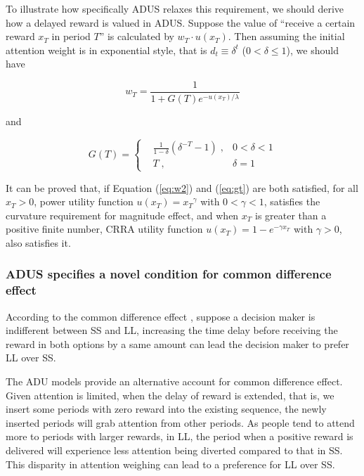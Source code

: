 \documentclass[
  12pt,
]{article}
\begin{document}
To illustrate how specifically ADUS relaxes this requirement, we should
derive how a delayed reward is valued in ADUS. Suppose the value of
``receive a certain reward \(x_T\) in period \(T\)'' is calculated by
\(w_T \cdot u(x_T)\). Then assuming the initial attention weight is in
exponential style, that is \(d_t\equiv\delta^t\) (\(0<\delta\leq1\)), we
should have

\begin{equation}\tag{2}\label{eq:w2}  
w_T = \frac{1}{1+G(T)e^{-u(x_T)/\lambda}}  
\end{equation}

and

\begin{equation}\tag{3}\label{eq:gt} 
G(T) = \left\{ 
\begin{aligned} 
& \frac{1}{1-\delta}(\delta^{-T}-1) \; ,& 0<\delta<1\\ 
& T\; ,& \delta=1
\end{aligned} \right. 
\end{equation}

It can be proved that, if Equation (\ref{eq:w2}) and (\ref{eq:gt}) are
both satisfied, for all \(x_T>0\), power utility function
\(u(x_T)={x_T}^\gamma\) with \(0<\gamma<1\), satisfies the curvature
requirement for magnitude effect, and when \(x_T\) is greater than a
positive finite number, CRRA utility function
\(u(x_T)=1-e^{-\gamma x_T}\) with \(\gamma>0\), also satisfies it.

\hypertarget{adus-specifies-a-novel-condition-for-common-difference-effect}{%
\subsubsection{ADUS specifies a novel condition for common difference
effect}\label{adus-specifies-a-novel-condition-for-common-difference-effect}}

According to the common difference effect
\citep{loewenstein_anomalies_1992}, suppose a decision maker is
indifferent between SS and LL, increasing the time delay before
receiving the reward in both options by a same amount can lead the
decision maker to prefer LL over SS.

The ADU models provide an alternative account for common difference
effect. Given attention is limited, when the delay of reward is
extended, that is, we insert some periods with zero reward into the
existing sequence, the newly inserted periods will grab attention from
other periods. As people tend to attend more to periods with larger
rewards, in LL, the period when a positive reward is delivered will
experience less attention being diverted compared to that in SS. This
disparity in attention weighing can lead to a preference for LL over SS.
\end{document}
